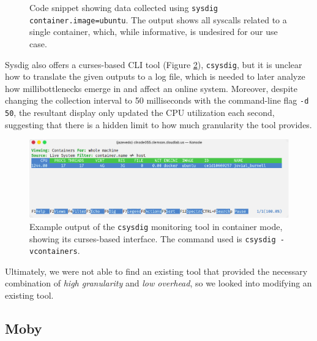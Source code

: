 \documentclass[a4paper,11pt]{article}
\newcommand{\granularity}{\textit{high granularity}\xspace}
\newcommand{\overhead}{\textit{low overhead}\xspace}
\begin{document}
\begin{figure}
    \caption{
        Code snippet showing data collected using \texttt{sysdig container.image=ubuntu}.
        The output shows all syscalls related to a single container, which, while informative, is undesired for our use case.
    }
    \label{fig:sysdig_out}
    \vspace{1em}
\end{figure}

Sysdig also offers a curses-based CLI tool (Figure \ref{fig:csysdig}), \texttt{csysdig},
but it is unclear how to translate the given outputs to a log file,
which is needed to later analyze how millibottlenecks emerge in and affect an online system.
Moreover, despite changing the collection interval to 50 milliseconds with the command-line flag \texttt{-d 50},
the resultant display only updated the CPU utilization each second,
suggesting that there is a hidden limit to how much granularity the tool provides.

\begin{figure}[H]
    \centering
    \includegraphics[width=\textwidth]{images/csysdig.png}
    \vspace{-0.3em}
    \caption{
        Example output of the \texttt{csysdig} monitoring tool in container mode,
        showing its curses-based interface. The command used is \texttt{csysdig -vcontainers}.
    }
    \label{fig:csysdig}
\end{figure}

Ultimately, we were not able to find an existing tool
that provided the necessary combination of \granularity and \overhead,
so we looked into modifying an existing tool.

\subsection{Moby}
\end{document}
